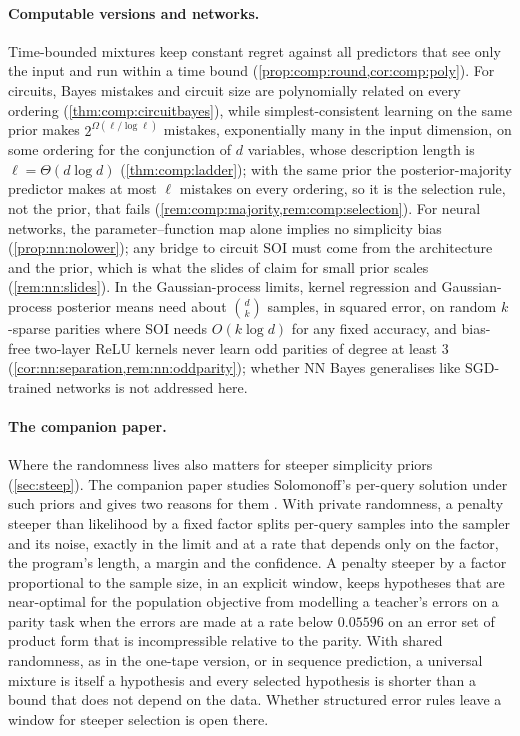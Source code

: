 \paragraph{Computable versions and networks.} Time-bounded mixtures keep constant regret against all predictors that see only the input and run within a time bound (\cref{prop:comp:round,cor:comp:poly}). For circuits, Bayes mistakes and circuit size are polynomially related on every ordering (\cref{thm:comp:circuitbayes}), while simplest-consistent learning on the same prior makes $2^{\Omega(\ell/\log\ell)}$ mistakes, exponentially many in the input dimension, on some ordering for the conjunction of $d$ variables, whose description length is $\ell=\Theta(d\log d)$ (\cref{thm:comp:ladder}); with the same prior the posterior-majority predictor makes at most $\ell$ mistakes on every ordering, so it is the selection rule, not the prior, that fails (\cref{rem:comp:majority,rem:comp:selection}). For neural networks, the parameter--function map alone implies no simplicity bias (\cref{prop:nn:nolower}); any bridge to circuit SOI must come from the architecture and the prior, which is what the slides of \citet{vaintrobhanni2026nnbayes} claim for small prior scales (\cref{rem:nn:slides}). In the Gaussian-process limits, kernel regression and Gaussian-process posterior means need about $\binom dk$ samples, in squared error, on random $k$-sparse parities where SOI needs $O(k\log d)$ for any fixed accuracy, and bias-free two-layer ReLU kernels never learn odd parities of degree at least $3$ (\cref{cor:nn:separation,rem:nn:oddparity}); whether NN Bayes generalises like SGD-trained networks is not addressed here.

\paragraph{The companion paper.} Where the randomness lives also matters for steeper simplicity priors (\cref{sec:steep}). The companion paper studies Solomonoff's per-query solution under such priors and gives two reasons for them \citep{claudeSFI2026steeper}. With private randomness, a penalty steeper than likelihood by a fixed factor splits per-query samples into the sampler and its noise, exactly in the limit and at a rate that depends only on the factor, the program's length, a margin and the confidence. A penalty steeper by a factor proportional to the sample size, in an explicit window, keeps hypotheses that are near-optimal for the population objective from modelling a teacher's errors on a parity task when the errors are made at a rate below $0.05596$ on an error set of product form that is incompressible relative to the parity. With shared randomness, as in the one-tape version, or in sequence prediction, a universal mixture is itself a hypothesis and every selected hypothesis is shorter than a bound that does not depend on the data. Whether structured error rules leave a window for steeper selection is open there.

